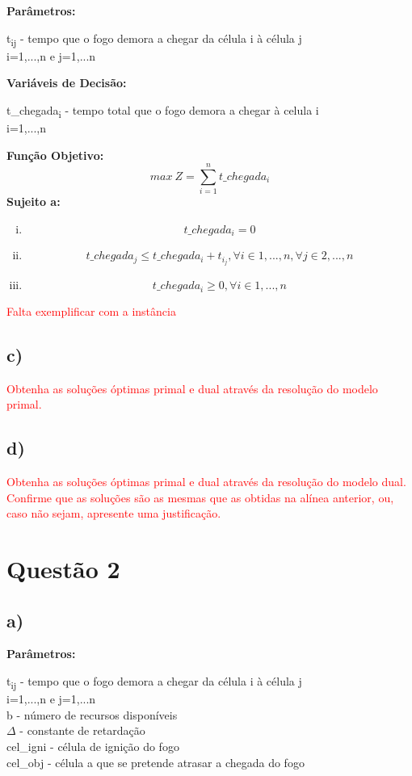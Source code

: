 \documentclass[11pt]{article} %
\begin{document}
\textbf{Parâmetros:}  \\
\begin{center}
t\textsubscript{ij} - tempo que o fogo demora a chegar da célula i à célula j \\
i=1,...,n e j=1,...n \\
\end{center}
\textbf{Variáveis de Decisão:} \\
\begin{center}
t\_chegada\textsubscript{i} - tempo total que o fogo demora a chegar à celula i \\
i=1,...,n\\
\end{center}
\textbf{Função Objetivo:} \\
$$max \ Z = \sum_{i=1}^{n} t\_chegada_i$$
\textbf{Sujeito a:}
\begin{enumerate}[(i)]
\item $$t\_chegada_i = 0$$
\item $$t\_chegada_j \leq t\_chegada_i + t_i_j, \forall i \in 1,...,n , \forall j \in 2,...,n$$
\item $$t\_chegada_i \geq 0, \forall i \in 1,...,n$$
\end{enumerate}

\textcolor{red}{Falta exemplificar com a instância}

\subsection*{c)}
\textcolor{red}{Obtenha as soluções óptimas primal e dual através da resolução do modelo primal.}

\subsection*{d)}
\textcolor{red}{Obtenha as soluções óptimas primal e dual através da resolução do modelo dual. Confirme que as soluções são as mesmas que as obtidas na alínea anterior, ou, caso não sejam, apresente uma justificação.}

\section*{Questão 2}
\subsection*{a)}
\textbf{Parâmetros:}  \\
\begin{center}
t\textsubscript{ij} - tempo que o fogo demora a chegar da célula i à célula j \\
i=1,...,n e j=1,...n \\
b - número de recursos disponíveis \\
$\Delta$ - constante de retardação \\
cel\_igni - célula de ignição do fogo \\
cel\_obj - célula a que se pretende atrasar a chegada do fogo
\end{center}
\end{document}
